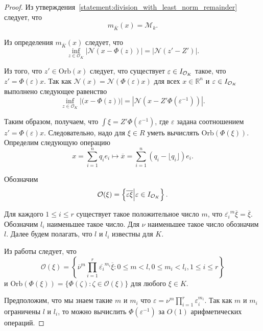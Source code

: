 \documentclass[_00_dissertation.tex]{subfiles}
\begin{document}
\begin{proof}
    Из утверждения~\ref{statement:division_with_least_norm_remainder} следует, что
    \begin{equation*}
        m_{\overline{K}}(x) = \mathcal{M}_k.
    \end{equation*}
    
    Из определения $m_{\overline{K}}(x)$ следует, что
    \begin{equation*}
        \inf\limits_{z \in \mathcal{O}_K} |\mathcal{N}(x - \Phi(z))| = |\mathcal{N}(z' - Z')|.
    \end{equation*}

    Из того, что $z' \in \textrm{Orb}(x)$ следует, что существует $\varepsilon \in I_{\mathcal{O}_K}$ такое, что $z' = \Phi(\varepsilon)x$.
    Так как $\mathcal{N}(x) = \mathcal{N}(\Phi(\varepsilon)x)$ для всех $x \in \mathbb{R}^n$ и $\varepsilon \in I_{\mathcal{O}_K}$ выполнено следующее равенство
    \begin{equation*}
        \inf\limits_{z \in \mathcal{O}_K} |\mathcal(x - \Phi(z))| = |\mathcal{N}(x - Z'\Phi(\varepsilon^{-1}))|.
    \end{equation*}

    Таким образом, получаем, что $\int{\xi} = Z'\Phi(\varepsilon^{-1})$, где $\varepsilon$ задана соотношением $z' = \Phi(\varepsilon)x$.
    Следовательно, надо для $\xi \in R$ уметь вычислять $\textrm{Orb}(\Phi(\xi))$.
    Определим следующую операцию
    \begin{equation*}
        x = \sum\limits_{i=1}^n q_i e_i \longmapsto \overline{x} = \sum\limits_{i=1}^n (q_i - \lfloor q_i \rfloor)e_i.
    \end{equation*}
    
    Обозначим
    \begin{equation*}
        \mathcal{O}(\xi) = \left\{
            \overline{\varepsilon\xi} \Big| \varepsilon \in I_{\mathcal{O}_K}
    	\right\}.
    \end{equation*}
    
    Для каждого $1 \le i \le r$ существует такое положительное число $m$, что $\overline{\varepsilon_i}^m\overline{\xi} = \overline{\xi}$.
    Обозначим $l_i$ наименьшее такое число.
    Для $\nu$ наименьшее такое число обозначим $l$.
    Далее будем полагать, что $l$ и $l_i$ известны для $K$.
    
    Из работы \cite[с.~1413]{source:Lezowski} следует, что
    \begin{equation*}
        \mathcal{O}(\xi) = \left\{
            \overline{\nu}^m \prod\limits_{i=1}^r \overline{\varepsilon_i}^{m_i} \overline{\xi}:
                0 \le m < l, 0 \le m_i < l_i, 1 \le i \le r
        \right\}
    \end{equation*}
    и $\textrm{Orb}(\Phi(\xi)) = \{\Phi(\zeta):\zeta \in \mathcal{O}(\xi)\}$ для любого $\xi\in K$.

    Предположим, что мы знаем такие $m$ и $m_i$ что $\varepsilon = \nu^m\prod_{i=1}^r \varepsilon_i^{m_i}$.
    Так как $m$ и $m_i$ ограничены $l$ и $l_i$, то можно вычислить $\Phi(\varepsilon^{-1})$ за $O(1)$ арифметических операций.
\end{proof}
\end{document}
